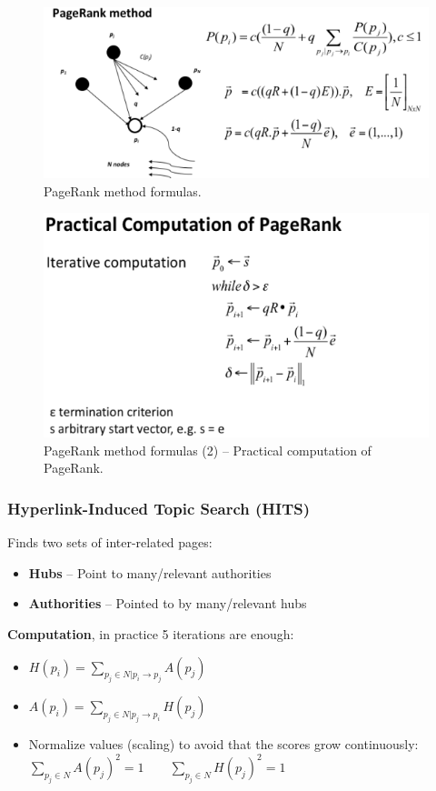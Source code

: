 \newpage

    \begin{figure}[htp]
      \centering
        \includegraphics[width=.65\textwidth]{images/pagerankf.png}
        \caption{PageRank method formulas.}
        \label{fig:pagerankf}
    \end{figure}
    \begin{figure}[htp]
      \centering
        \includegraphics[width=.65\textwidth]{images/pagerankf2.png}
        \caption{PageRank method formulas (2) -- Practical computation of PageRank.}
        \label{fig:pagerankf2}
    \end{figure}

  \subsubsection{Hyperlink-Induced Topic Search (HITS)} %
  \label{ssub:hyperlink_induced_topic_search_hits}
    Finds two sets of inter-related pages:
    \begin{itemize}
      \item \textbf{Hubs} -- Point to many/relevant authorities
      \item \textbf{Authorities} -- Pointed to by many/relevant hubs
    \end{itemize}

    \textbf{Computation}, in practice 5 iterations are enough:
    \begin{itemize}
      \item $H(p_i) = \sum_{p_j \in N | p_i\rightarrow p_j}{A(p_j)}$
      \item $A(p_i) = \sum_{p_j \in N | p_j\rightarrow p_i}{H(p_j)}$
      \item Normalize values (scaling) to avoid that the scores grow continuously:\\ $\sum_{p_j\in N}{A(p_j)^2}=1 \qquad \sum_{p_j\in N}{H(p_j)^2}=1$
    \end{itemize}

